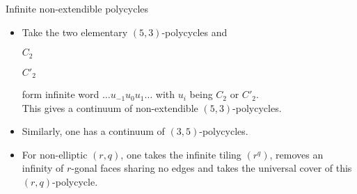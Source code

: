 \documentclass[%
pdf,
colorBG,
slideColor,
]{prosper}
\begin{document}
\begin{slide}{Infinite non-extendible polycycles}
\begin{itemize}
\item Take the two elementary $(5,3)$-polycycles and
\begin{center}
\begin{minipage}{3.7cm}
\centering
{}\par
$C_2$
\end{minipage}
\begin{minipage}{3.7cm}
\centering
{}\par
$C'_2$
\end{minipage}
\end{center}
form infinite word $\dots u_{-1}u_0u_1\dots$ with $u_i$ being $C_2$ or $C'_2$.\\
This gives a continuum of non-extendible $(5,3)$-polycycles.
\item Similarly, one has a continuum of $(3,5)$-polycycles.
\item For non-elliptic $(r,q)$, one takes the infinite tiling $(r^q)$, removes an infinity of $r$-gonal faces sharing no edges and takes the universal cover of this $(r, q)$-polycycle.
\end{itemize}
\end{slide}
\end{document}
